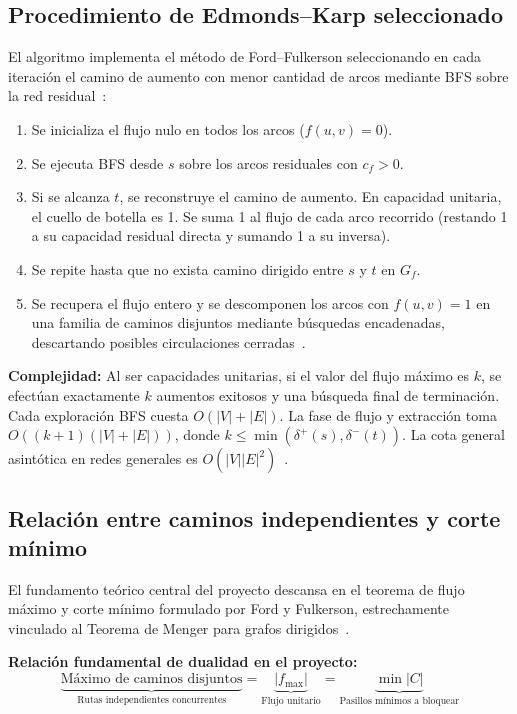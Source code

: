\documentclass[11pt,a4paper]{article}
\newcommand{\tema}[1]{\subsection*{\color{verde}#1}}
\begin{document}
\tema{Procedimiento de Edmonds–Karp seleccionado}
El algoritmo implementa el método de Ford–Fulkerson seleccionando en cada iteración el camino de aumento con menor cantidad de arcos mediante BFS sobre la red residual~\cite{edmondskarp,zeh}:
\begin{enumerate}
  \item Se inicializa el flujo nulo en todos los arcos ($f(u, v) = 0$).
  \item Se ejecuta BFS desde $s$ sobre los arcos residuales con $c_f > 0$.
  \item Si se alcanza $t$, se reconstruye el camino de aumento. En capacidad unitaria, el cuello de botella es 1. Se suma 1 al flujo de cada arco recorrido (restando 1 a su capacidad residual directa y sumando 1 a su inversa).
  \item Se repite hasta que no exista camino dirigido entre $s$ y $t$ en $G_f$.
  \item Se recupera el flujo entero y se descomponen los arcos con $f(u, v) = 1$ en una familia de caminos disjuntos mediante búsquedas encadenadas, descartando posibles circulaciones cerradas~\cite{cormen}.
\end{enumerate}

\textbf{Complejidad:} Al ser capacidades unitarias, si el valor del flujo máximo es $k$, se efectúan exactamente $k$ aumentos exitosos y una búsqueda final de terminación. Cada exploración BFS cuesta $O(|V| + |E|)$. La fase de flujo y extracción toma $O((k+1)(|V| + |E|))$, donde $k \le \min(\delta^+(s), \delta^-(t))$. La cota general asintótica en redes generales es $O(|V||E|^2)$~\cite{cormen}.

\subsection{Relación entre caminos independientes y corte mínimo}
El fundamento teórico central del proyecto descansa en el teorema de flujo máximo y corte mínimo formulado por Ford y Fulkerson, estrechamente vinculado al Teorema de Menger para grafos dirigidos~\cite{cormen,zeh}.

\begin{center}
\colorbox{fondo}{
\begin{minipage}{0.92\linewidth}
\vspace{2mm}
\centering
\textbf{Relación fundamental de dualidad en el proyecto:}
\[
  \underbrace{\text{Máximo de caminos disjuntos}}_{\text{Rutas independientes concurrentes}} = \underbrace{|f_{\max}|}_{\text{Flujo unitario}} = \underbrace{\min |C|}_{\text{Pasillos mínimos a bloquear}}
\]
\vspace{1mm}
\end{minipage}}
\end{center}
\end{document}
